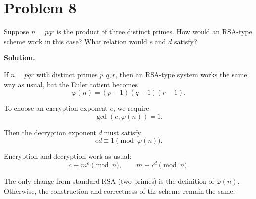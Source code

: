 \section*{Problem 8}

Suppose \(n = pqr\) is the product of three distinct primes. How would an RSA-type
scheme work in this case? What relation would \(e\) and \(d\) satisfy?

\textbf{Solution.}

If \(n = pqr\) with distinct primes \(p, q, r\), then an RSA-type system works the same way as usual,
but the Euler totient becomes
\[
\varphi(n) = (p-1)(q-1)(r-1).
\]

To choose an encryption exponent \(e\), we require
\[
\gcd(e, \varphi(n)) = 1.
\]

Then the decryption exponent \(d\) must satisfy
\[
ed \equiv 1 \pmod{\varphi(n)}.
\]

Encryption and decryption work as usual:
\[
c \equiv m^e \pmod{n}, \qquad m \equiv c^d \pmod{n}.
\]

The only change from standard RSA (two primes) is the definition of \(\varphi(n)\).  
Otherwise, the construction and correctness of the scheme remain the same.

